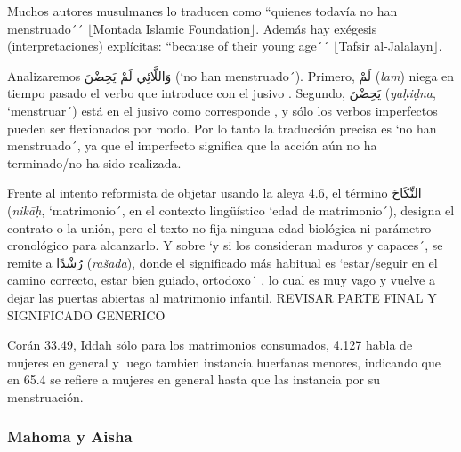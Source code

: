\documentclass[12pt]{report}
\begin{document}
	\begin{subbloque}[Dúplica 1]
		Muchos autores musulmanes lo traducen como ``quienes todavía no han menstruado´´ $\lfloor$Montada Islamic Foundation$\rfloor$. Además hay exégesis (interpretaciones) explícitas: ``because of their young age´´ $\lfloor$Tafsir al-Jalalayn$\rfloor$.
		
		Analizaremos \textarabic{وَاللَّائِي لَمْ يَحِضْنَ} (`no han menstruado´). Primero, \textarabic{لَمْ} (\textit{lam}) niega en tiempo pasado el verbo que introduce con el jusivo . Segundo, \textarabic{يَحِضْنَ} (\textit{yaḥiḍna}, `menstruar´) está en el jusivo como corresponde , y sólo los verbos imperfectos pueden ser flexionados por modo. Por lo tanto la traducción precisa es `no han menstruado´, ya que el imperfecto significa que la acción aún no ha terminado/no ha sido realizada.
		
		Frente al intento reformista de objetar usando la aleya 4.6, el término \textarabic{النِّكَاحَ} (\textit{nikāḥ}, `matrimonio´, en el contexto lingüístico `edad de matrimonio´), designa el contrato o la unión, pero el texto no fija ninguna edad biológica ni parámetro cronológico para alcanzarlo. Y sobre `y si los consideran maduros y capaces´, se remite a \textarabic{رُشْدًا} (\textit{rašada}), donde el significado más habitual es `estar/seguir en el camino correcto, estar bien guiado, ortodoxo´ , lo cual es muy vago y vuelve a dejar las puertas abiertas al matrimonio infantil. REVISAR PARTE FINAL Y SIGNIFICADO GENERICO
	\end{subbloque}
	
	\begin{minibloque}
		
	\end{minibloque}
	
	\begin{subminibloque}[Dúplica 2]
		Corán 33.49, Iddah sólo para los matrimonios consumados, 4.127 habla de mujeres en general y luego tambien instancia huerfanas menores, indicando que en 65.4 se refiere a mujeres en general hasta que las instancia por su menstruación.
	\end{subminibloque}


	\subsubsection{Mahoma y Aisha}
	
\end{document}
